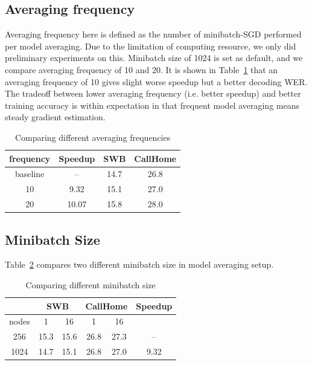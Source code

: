 \documentclass{article}
\begin{document}
\subsection{Averaging frequency}
Averaging frequency here is defined as the number of minibatch-SGD performed per model averaging.
Due to the limitation of computing resource, we only did preliminary experiments on this. Minibatch size of 1024 
is set as default, and we compare averaging frequency of 10 and 20. It is shown in Table~\ref{tab:freq} that an averaging 
frequency of 10 gives slight worse speedup but a better decoding WER. The tradeoff between lower averaging frequency 
(i.e. better speedup) and better training accuracy is within expectation in that frequent model averaging means 
steady gradient estimation.

\begin{table}
  \centering
  \begin{tabular}{c|c|c|c}
    \hline
    frequency   & Speedup   & SWB   & CallHome \\
    \hline
    baseline    &   --      & 14.7  & 26.8\\
    \hline
    10          & 9.32      & 15.1  & 27.0 \\
    \hline
    20          & 10.07     & 15.8  & 28.0 \\
    \hline
  \end{tabular}
  \caption{Comparing different averaging frequencies}
  \label{tab:freq}
\end{table}

\subsection{Minibatch Size}
Table~\ref{tab:mbsize} compares two different minibatch size in model averaging setup.
\begin{table}
  \centering
  \begin{tabular}{c|c|c|c|c|c}
    \hline
    & \multicolumn{2}{c|}{SWB}    & \multicolumn{2}{c|}{CallHome} & Speedup\\
    \hline
    nodes       &  1    &   16    &    1     &   16   &    \\
    \hline
    256         & 15.3     & 15.6 & 26.8     &  27.3   & -- \\
    \hline
    1024        & 14.7     & 15.1 & 26.8     &  27.0   & 9.32\\
    \hline
  \end{tabular}
  \caption{Comparing different minibatch size}
  \label{tab:mbsize}
\end{table}
\end{document}
